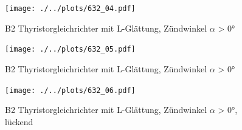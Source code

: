 \begin{figure}[h!]
    \centering
    \texttt{[image: ./../plots/632\_04.pdf]}
    \caption{B2 Thyristorgleichrichter mit L-Glättung, Zündwinkel $\alpha$ > 0°}
    \label{fig:b2_diode_l16}
\end{figure}

\begin{figure}[h!]
    \centering
    \texttt{[image: ./../plots/632\_05.pdf]}
    \caption{B2 Thyristorgleichrichter mit L-Glättung, Zündwinkel $\alpha$ > 0°}
    \label{fig:b2_diode_l11}
\end{figure}

\begin{figure}[h!]
    \centering
    \texttt{[image: ./../plots/632\_06.pdf]}
    \caption{B2 Thyristorgleichrichter mit L-Glättung, Zündwinkel $\alpha$ > 0°, lückend}
    \label{fig:b2_diode_l6}
\end{figure}

\clearpage
